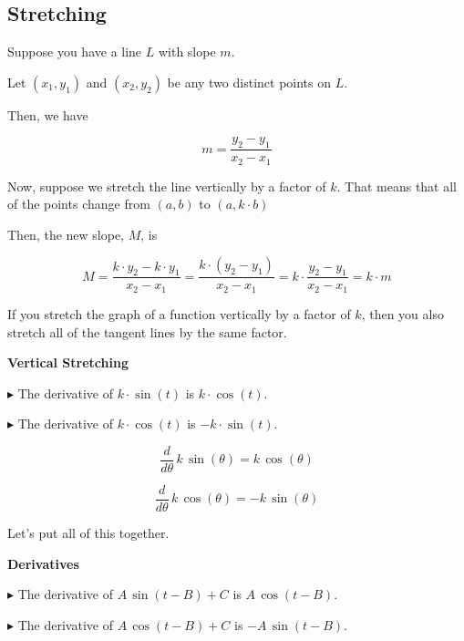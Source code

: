 \documentclass{ximera}
\begin{document}
\subsection*{Stretching}


Suppose you have a line $L$ with slope $m$. 

Let $(x_1, y_1)$ and $(x_2, y_2)$ be any two distinct points on $L$. 

Then, we have


\[
m = \frac{y_2 - y_1}{x_2 - x_1}
\]






Now, suppose we stretch the line vertically by a factor of $k$.  That means that all of the points change from $(a, b)$ to $(a, k \cdot b)$

Then, the new slope, $M$, is 



\[
M = \frac{k \cdot y_2 - k \cdot y_1}{x_2 - x_1} = \frac{k \cdot (y_2 - y_1)}{x_2 - x_1} = k \cdot \frac{y_2 - y_1}{x_2 - x_1} = k \cdot m
\]


If you stretch the graph of a function vertically by a factor of $k$, then you also stretch all of the tangent lines by the same factor.


\begin{observation} \textbf{\textcolor{-red!75}{Vertical Stretching}}   

$\blacktriangleright$ The derivative of $k \cdot \sin(t)$ is $k \cdot \cos(t)$. 

$\blacktriangleright$ The derivative of $k \cdot \cos(t)$ is $-k \cdot \sin(t)$. 

\end{observation}




\begin{notation}

\[
\frac{d}{d\theta} \, k \, \sin(\theta) = k \, \cos(\theta)
\]

\[
\frac{d}{d\theta} \, k \, \cos(\theta) = -k \, \sin(\theta)
\]

\end{notation}








Let's put all of this together.







\begin{theorem} \textbf{\textcolor{green!50!black}{Derivatives}}  

$\blacktriangleright$ The derivative of \textbf{\textcolor{purple!85!blue}{$A \, \sin(t - B) + C$}} is \textbf{\textcolor{blue!55!black}{$A \, \cos(t - B)$}}. 

$\blacktriangleright$ The derivative of \textbf{\textcolor{purple!85!blue}{$A \, \cos(t - B) + C$}} is \textbf{\textcolor{blue!55!black}{$-A \, \sin(t - B)$}}. 

\end{theorem}
\end{document}

